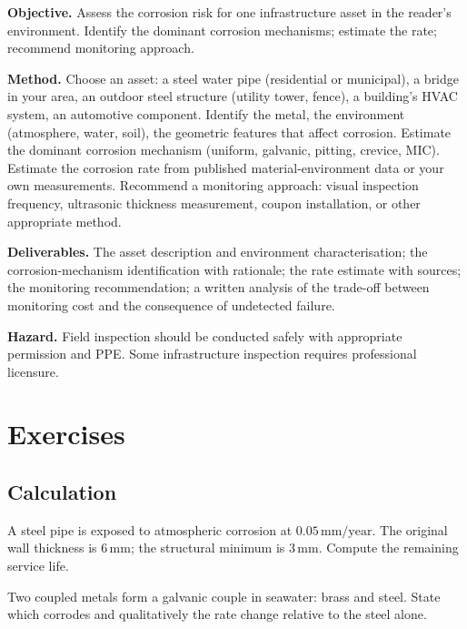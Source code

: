 \begin{project}
\textbf{Objective.} Assess the corrosion risk for one infrastructure asset in the reader's environment. Identify the dominant corrosion mechanisms; estimate the rate; recommend monitoring approach.

\textbf{Method.} Choose an asset: a steel water pipe (residential or municipal), a bridge in your area, an outdoor steel structure (utility tower, fence), a building's HVAC system, an automotive component. Identify the metal, the environment (atmosphere, water, soil), the geometric features that affect corrosion. Estimate the dominant corrosion mechanism (uniform, galvanic, pitting, crevice, MIC). Estimate the corrosion rate from published material-environment data or your own measurements. Recommend a monitoring approach: visual inspection frequency, ultrasonic thickness measurement, coupon installation, or other appropriate method.

\textbf{Deliverables.} The asset description and environment characterisation; the corrosion-mechanism identification with rationale; the rate estimate with sources; the monitoring recommendation; a written analysis of the trade-off between monitoring cost and the consequence of undetected failure.

\textbf{Hazard.} Field inspection should be conducted safely with appropriate permission and PPE. Some infrastructure inspection requires professional licensure.
\end{project}

\section{Exercises}

\subsection*{Calculation}

\begin{exercise}
A steel pipe is exposed to atmospheric corrosion at $0.05\,\text{mm/year}$. The original wall thickness is $6\,\text{mm}$; the structural minimum is $3\,\text{mm}$. Compute the remaining service life.
\end{exercise}

\begin{exercise}
Two coupled metals form a galvanic couple in seawater: brass and steel. State which corrodes and qualitatively the rate change relative to the steel alone.
\end{exercise}

